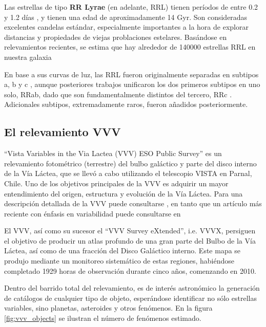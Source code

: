 \par Las estrellas de tipo \textbf{RR Lyrae} (en adelante, RRL) tienen períodos de entre 0.2 y 1.2 días \cite{smith}, y tienen una edad de aproximadamente 14 Gyr. Son consideradas excelentes candelas estándar, especialmente importantes a la hora de explorar distancias y propiedades de viejas problaciones estelares. Basándose en relevamientos recientes, se estima que hay alrededor de 140000 estrellas RRL en nuestra galaxia \cite{ogle} \cite{gaia} \\

\par En base a sus curvas de luz, las RRL fueron originalmente separadas en subtipos a, b y c \cite{bailey}, aunque posteriores trabajos unificaron los dos primeros subtipos en uno solo, RRab, dado que son fundamentalmente distintos del tercero, RRc \cite{schwarzschild}. Adicionales subtipos, extremadamente raros, fueron añadidos posteriormente. \\

\subsection{El relevamiento VVV}

\par ``Vista Variables in the Via Lactea (VVV) ESO Public Survey'' es un relevamiento fotométrico (terrestre) del bulbo galáctico y parte del disco interno de la Vía Láctea, que se llevó a cabo utilizando el telescopio VISTA en Parnal, Chile.  Uno de los objetivos principales de la VVV es adquirir un mayor entendimiento del origen, estructura y evolución de la Vía Láctea. Para una descripción detallada de la VVV puede consultarse \cite{vvv}, en tanto que un artículo más reciente con énfasis en variabilidad puede consultarse en \cite{vvv_actual} \\

\par El VVV, así como su sucesor el ``VVV Survey eXtended'', i.e. VVVX, persiguen el objetivo de producir un atlas profundo de una gran parte del Bulbo de la Vía Láctea, así como de una fracción del Disco Galáctico interno. Este mapa se produjo mediante un monitoreo sistemático de estas regiones, habiéndose completado 1929 horas de observación durante cinco años, comenzando en 2010. \\

\par Dentro del barrido total del relevamiento, es de interés astronómico la generación de catálogos de cualquier tipo de objeto, esperándose identificar no sólo estrellas variables, sino planetas, asteroides y otros fenómenos. En la figura \ref{fig:vvv_objects} se ilustran el número de fenómenos estimado.

